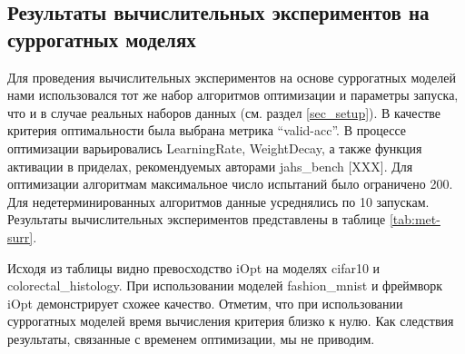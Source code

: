 \documentclass[preprint,12pt]{elsarticle}
\begin{document}
\subsection{Результаты вычислительных экспериментов на суррогатных моделях}

Для проведения вычислительных экспериментов на основе суррогатных моделей нами использовался тот же набор алгоритмов оптимизации и параметры запуска, что и в случае реальных наборов данных (см. раздел \ref{sec_setup}). В качестве критерия оптимальности была выбрана метрика ``valid-acc''. В процессе оптимизации варьировались LearningRate, WeightDecay, а также функция активации в приделах, рекомендуемых авторами jahs\_bench [XXX]. Для оптимизации алгоритмам максимальное число испытаний было ограничено 200. Для недетерминированных алгоритмов данные усреднялись по 10 запускам. Результаты вычислительных экспериментов представлены в таблице \ref{tab:met-surr}.

\begin{table}
\centering
\caption{Values of optimized metrics for the algorithms averaged over 10 runs (surrogate models)}
\label{tab:met-surr}
\end{table}
Исходя из таблицы видно превосходство iOpt на моделях cifar10 и colorectal\_histology. При использовании моделей fashion\_mnist и фреймворк iOpt демонстрирует схожее качество. Отметим, что при использовании суррогатных моделей время вычисления критерия близко к нулю. Как следствия результаты, связанные с временем оптимизации, мы не приводим. 
\end{document}
